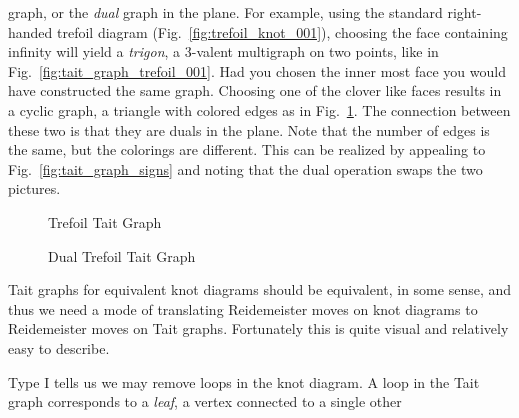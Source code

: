         graph, or the \textit{dual} graph in the plane. For example, using the
        standard right-handed trefoil diagram
        (Fig.~\ref{fig:trefoil_knot_001}), choosing the face containing
        infinity will yield a \textit{trigon}, a 3-valent multigraph on two
        points, like in Fig.~\ref{fig:tait_graph_trefoil_001}. Had you chosen
        the inner most face you would have constructed the same graph. Choosing
        one of the clover like faces results in a cyclic graph, a triangle with
        colored edges as in Fig.~\ref{fig:tait_graph_trefoil_002}. The
        connection between these two is that they are duals in the plane.
        Note that the number of edges is the same, but the colorings are
        different. This can be realized by appealing to
        Fig.~\ref{fig:tait_graph_signs} and noting that the dual operation
        swaps the two pictures.
        \begin{figure}
            \centering
            \begin{minipage}[b]{0.49\textwidth}
                \centering
                \vspace{2em}
                \caption{Trefoil Tait Graph}
                \label{fig:tait_graph_trefoil_001}
            \end{minipage}
            \hfill
            \begin{minipage}[b]{0.49\textwidth}
                \centering
                \caption{Dual Trefoil Tait Graph}
                \label{fig:tait_graph_trefoil_002}
            \end{minipage}
        \end{figure}
        \par\hfill\par
        Tait graphs for equivalent knot diagrams should be equivalent,
        in some sense, and thus
        we need a mode of translating Reidemeister moves on knot diagrams to
        Reidemeister moves on Tait graphs. Fortunately this is quite visual and
        relatively easy to describe.
        \par\hfill\par
        Type I tells us we may remove loops in the knot diagram.
        A loop in the Tait graph
        corresponds to a \textit{leaf}, a vertex connected to a single other

